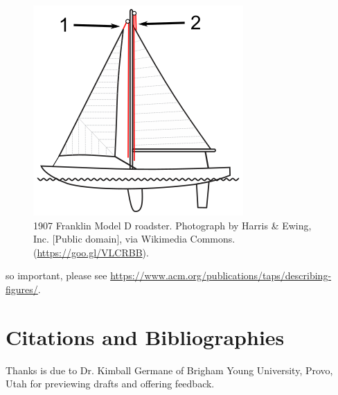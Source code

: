\documentclass[sigconf]{acmart}
\begin{document}
\begin{figure}[h]
  \centering
  \includegraphics[width=\linewidth]{img/Halyard}
  \caption{1907 Franklin Model D roadster. Photograph by Harris \&
    Ewing, Inc. [Public domain], via Wikimedia
    Commons. (\url{https://goo.gl/VLCRBB}).}
\end{figure}

so important, please see
\url{https://www.acm.org/publications/taps/describing-figures/}.

\section{Citations and Bibliographies}

\begin{acks}
    Thanks is due to Dr. Kimball Germane of Brigham Young University, Provo,
    Utah for previewing drafts and offering feedback.
\end{acks}




\appendix
\end{document}
